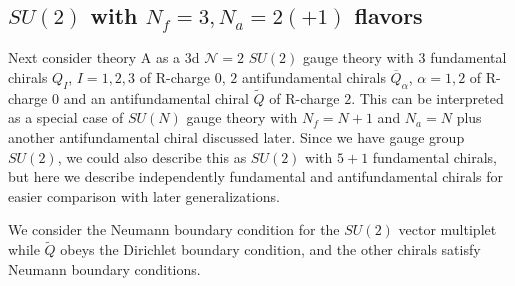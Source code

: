 \documentclass[12pt]{article}
\numberwithin{equation}{section}
\begin{document}
\subsection{$SU(2)$ with $N_f=3, N_a=2(+1)$ flavors}
\label{sec_su2nf3na3}
Next consider theory A as a 3d $\mathcal{N}=2$ $SU(2)$ gauge theory 
with $3$ fundamental chirals $Q_I$, $I=1,2,3$ of R-charge $0$, 
$2$ antifundamental chirals $\overline{Q}_{\alpha}$, $\alpha=1,2$ of R-charge $0$ 
and an antifundamental chiral $\tilde{Q}$ of R-charge $2$. 
This can be interpreted as a special case of $SU(N)$ gauge theory with $N_f=N+1$ and $N_a=N$ plus another antifundamental chiral discussed later. Since we have gauge group $SU(2)$, we could also describe this as $SU(2)$ with $5 + 1$ fundamental chirals, but here we describe independently fundamental and antifundamental chirals for easier comparison with later generalizations.

We consider the Neumann boundary condition for the $SU(2)$ vector multiplet 
while $\tilde{Q}$ obeys the Dirichlet boundary condition, 
and the other chirals satisfy Neumann boundary conditions. 
\end{document}
